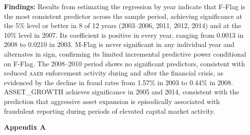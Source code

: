 \documentclass[12pt]{article}
\begin{document}
\noindent
\textbf{Findings:}
Results from estimating the regression by year indicate that F-Flag is the most
consistent predictor across the sample period, achieving significance at the 5\%
level or better in 8 of 12 years (2003--2006, 2011, 2012, 2014) and at the 10\%
level in 2007. Its coefficient is positive in every year, ranging from 0.0013
in 2008 to 0.0210 in 2003. M-Flag is never significant in any individual year
and alternates in sign, confirming its limited incremental predictive power
conditional on F-Flag. The 2008--2010 period shows no significant predictors,
consistent with reduced \textsc{aaer} enforcement activity during and after the
financial crisis, as evidenced by the decline in fraud rates from 1.57\% in 2003
to 0.44\% in 2008. ASSET\_GROWTH achieves significance in 2005 and 2014,
consistent with the prediction that aggressive asset expansion is episodically
associated with fraudulent reporting during periods of elevated capital market
activity.


\newpage
\noindent\textbf{Appendix A}
\end{document}
